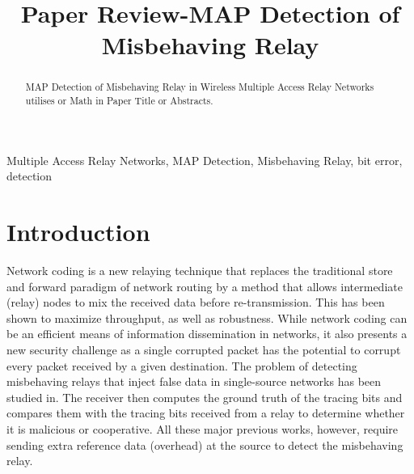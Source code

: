 \documentclass[conference]{IEEEtran}
\begin{document}
\title{Paper Review-MAP Detection of Misbehaving Relay \\
}

\author{
\and
{}
\and
{}
}

\maketitle

\begin{abstract}
MAP Detection of Misbehaving Relay in Wireless Multiple Access Relay Networks utilises 
or Math in Paper Title or Abstracts.
\end{abstract}

\begin{IEEEkeywords}
Multiple Access Relay Networks, MAP Detection, Misbehaving Relay, bit error, detection
\end{IEEEkeywords}

\section{Introduction}
Network coding is a new relaying technique that replaces the traditional store and forward paradigm of network routing by a method that allows intermediate (relay) nodes to mix the received data before re-transmission. \newline
This has been shown to maximize throughput, as well as robustness. While network coding can be an efficient means of information dissemination in networks, it also presents a new security challenge as a single corrupted packet has the potential to corrupt every packet received by a given destination.\newline
The problem of detecting misbehaving relays that inject false data in single-source networks has been studied in. The receiver then computes the ground truth of the tracing bits and compares them with the tracing bits received from a relay to determine whether it is malicious or cooperative. All these major previous works, however, require sending extra reference data (overhead) at the source to detect the misbehaving relay.  
\end{document}
